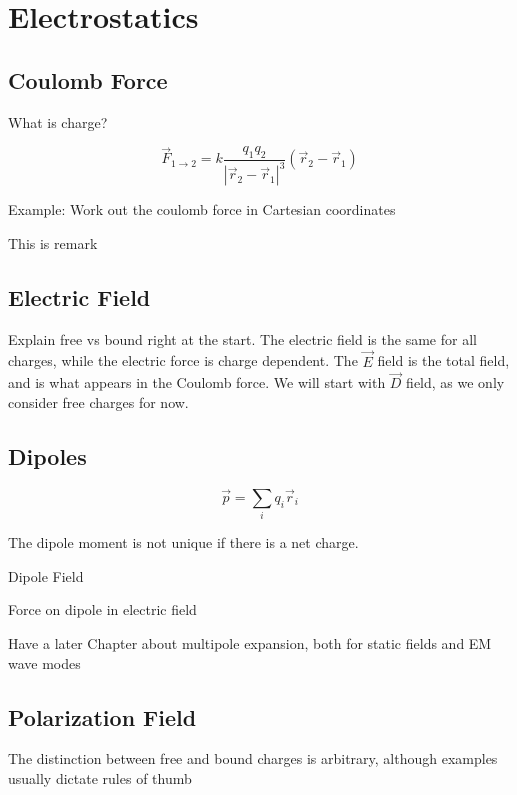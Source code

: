 \documentclass[12pt,a4paper,violet]{bbe}
\begin{document}
\chapter{Electrostatics}
	\section{Coulomb Force}
	What is charge? 
	
	\begin{definition}
	$$ \vec{F}_{1 \rightarrow 2} = k \frac{q_1 q_2}{|\vec{r}_2 - \vec{r}_1|^3} (\vec{r}_2 - \vec{r}_1)$$
	\end{definition}
	
	Example: Work out the coulomb force in Cartesian coordinates
	
	\begin{remark}
	This is remark
	\end{remark}
	
	\section{Electric Field}
	Explain free vs bound right at the start. The electric field is the same for all charges, while the electric force is charge dependent. The $\Vec{E}$ field is the total field, and is what appears in the Coulomb force.
    We will start with $\Vec{D}$ field, as we only consider free charges for now.
	
	\section{Dipoles}
	
	\begin{definition}
	$$ \vec{p} = \sum_i q_i \vec{r}_i$$
	\end{definition}
	
	The dipole moment is not unique if there is a net charge.
	
	Dipole Field
	
	Force on dipole in electric field
	
	Have a later Chapter about multipole expansion, both for static fields and EM wave modes
	
	
	\section{Polarization Field}
	\begin{remark}
	The distinction between free and bound charges is arbitrary, although examples usually dictate rules of thumb
	\end{remark}
	
\end{document}
